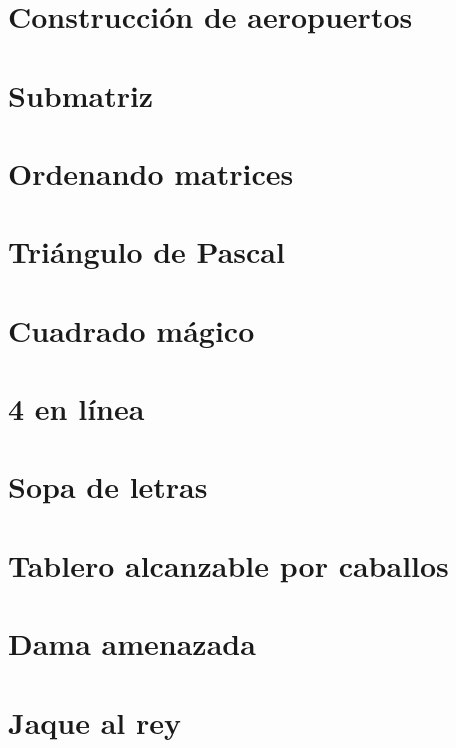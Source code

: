 \section{Construcción de aeropuertos}


\section{Submatriz}


\section{Ordenando matrices}


\section{Triángulo de Pascal}


\section{Cuadrado mágico}





\section{4 en línea}


\section{Sopa de letras}


\section{Tablero alcanzable por caballos}


\section{Dama amenazada}


\section{Jaque al rey}


